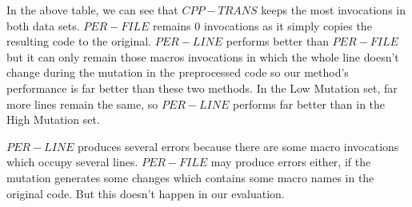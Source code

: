 In the above table, we can see that $CPP-TRANS$ keeps the most invocations in both data sets.
$PER-FILE$ remains 0 invocations as it simply copies the resulting code to the original. 
$PER-LINE$ performs better than $PER-FILE$ but it can only remain those macros invocations in which the whole line doesn't change during the mutation in the preprocessed code so our method's performance is far better than these two methods.
In the Low Mutation set, far more lines remain the same, so $PER-LINE$ performs far better than in the High Mutation set.

$PER-LINE$ produces several errors because there are some macro invocations which occupy several lines.
$PER-FILE$ may produce errors either, if the mutation generates some changes which contains some macro names in the original code. But this doesn't happen in our evaluation.




